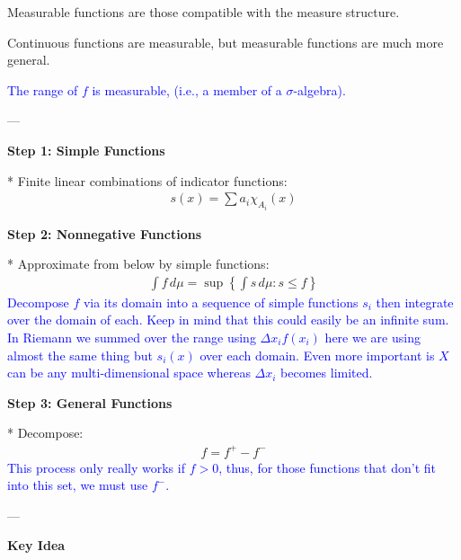\documentclass[12pt,a4paper]{report}
\newcommand{\BLUE}[1]{\textcolor{blue}{#1}}
\begin{document}
\begin{description}
\begin{description}
		\begin{itemize}
        \item Measurable functions are those compatible with the measure structure.
        \item Continuous functions are measurable, but measurable functions are much more general.
\BLUE{
		\item The range of $f$ is measurable, (i.e., a member of a $\sigma$-algebra).
}
		\end{itemize}
	\end{description}

---

\item {}

	\begin{description}
    \item \textbf{Step 1: Simple Functions}

* Finite linear combinations of indicator functions:
    \begin{align*}
        s(x) = \sum a_i \chi_{A_i}(x)
    \end{align*}

    \item \textbf{Step 2: Nonnegative Functions}

* Approximate from below by simple functions:
    \begin{align*}
        \int f\, d\mu = \sup \left\{ \int s\, d\mu : s \le f \right\}
    \end{align*}\BLUE{Decompose $f$ via its domain into a sequence of simple functions $s_i$ then integrate over the domain of each.  Keep in mind that this could easily be an infinite sum.  In Riemann we summed over the range using $\Delta x_i f(x_i)$ here we are using almost the same thing but $s_i(x)$ over each domain. Even more important is $X$ can be any multi-dimensional space whereas $\Delta x_i$ becomes limited.}

    \item \textbf{Step 3: General Functions}

* Decompose:
    \begin{align*}
        f = f^+ - f^-
    \end{align*}\BLUE{This process only really works if $f>0$, thus, for those functions that don't fit into this set, we must use $f^-$.}

---

    \item \textbf{Key Idea}


\end{description}
\end{description}
\end{document}
